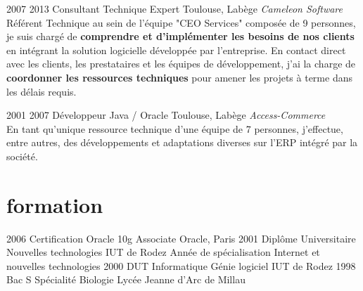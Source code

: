 \documentclass{friggeri-cv} 	%
\begin{document}
\begin{entrylist}
\entry
{2007  2013}
{Consultant Technique Expert}
{Toulouse, Labège}
{\vspace{0.2cm}\emph{Cameleon Software} \\
Référent Technique au sein de l’équipe "CEO Services" composée de 9 personnes, je suis chargé de \textbf{comprendre et d’implémenter les besoins de nos clients} en intégrant la solution logicielle développée par l’entreprise. En contact direct avec les clients, les prestataires et les équipes de développement, j’ai la charge de \textbf{coordonner les ressources techniques} pour amener les projets à terme dans les délais requis.
\
}

\entry
{2001  2007}
{Développeur Java / Oracle}
{Toulouse, Labège}
{\vspace{0.2cm}\emph{Access-Commerce}  \\
En tant qu’unique ressource technique d’une équipe de 7 personnes, j’effectue, entre autres, des développements et adaptations diverses sur l’ERP intégré par la société.
}
\end{entrylist}


\section{formation}

\begin{entrylist}
\entry
{2006}
{Certification Oracle {\normalfont 10g Associate}}
{Oracle, Paris}
{}
\entry
{2001}
{Diplôme Universitaire {\normalfont Nouvelles technologies}}
{IUT de Rodez}
{Année de spécialisation Internet et nouvelles technologies}
\entry
{2000}
{DUT {\normalfont Informatique Génie logiciel}}
{IUT de Rodez}
{}
\entry
{1998}
{Bac S {\normalfont Spécialité Biologie}}
{Lycée Jeanne d’Arc de Millau}
{}
\end{entrylist}
\end{document}
